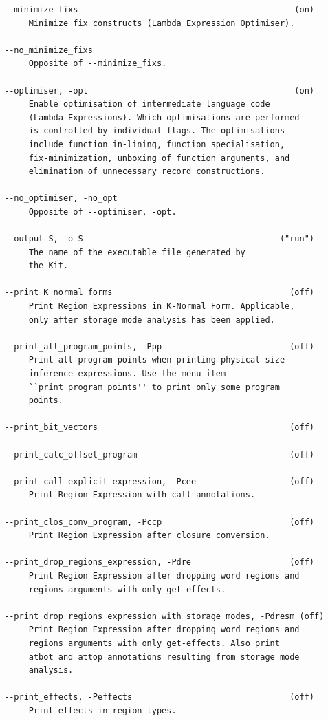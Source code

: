 \documentclass[12pt]{book}
\begin{document}
\begin{verbatim}
--minimize_fixs                                            (on)
     Minimize fix constructs (Lambda Expression Optimiser).

--no_minimize_fixs
     Opposite of --minimize_fixs.

--optimiser, -opt                                          (on)
     Enable optimisation of intermediate language code
     (Lambda Expressions). Which optimisations are performed
     is controlled by individual flags. The optimisations
     include function in-lining, function specialisation,
     fix-minimization, unboxing of function arguments, and
     elimination of unnecessary record constructions.

--no_optimiser, -no_opt
     Opposite of --optimiser, -opt.

--output S, -o S                                        ("run")
     The name of the executable file generated by
     the Kit.

--print_K_normal_forms                                    (off)
     Print Region Expressions in K-Normal Form. Applicable,
     only after storage mode analysis has been applied.

--print_all_program_points, -Ppp                          (off)
     Print all program points when printing physical size
     inference expressions. Use the menu item
     ``print program points'' to print only some program
     points.

--print_bit_vectors                                       (off)

--print_calc_offset_program                               (off)

--print_call_explicit_expression, -Pcee                   (off)
     Print Region Expression with call annotations.

--print_clos_conv_program, -Pccp                          (off)
     Print Region Expression after closure conversion.

--print_drop_regions_expression, -Pdre                    (off)
     Print Region Expression after dropping word regions and
     regions arguments with only get-effects.

--print_drop_regions_expression_with_storage_modes, -Pdresm (off)
     Print Region Expression after dropping word regions and
     regions arguments with only get-effects. Also print
     atbot and attop annotations resulting from storage mode
     analysis.

--print_effects, -Peffects                                (off)
     Print effects in region types.


\end{verbatim}
\end{document}
